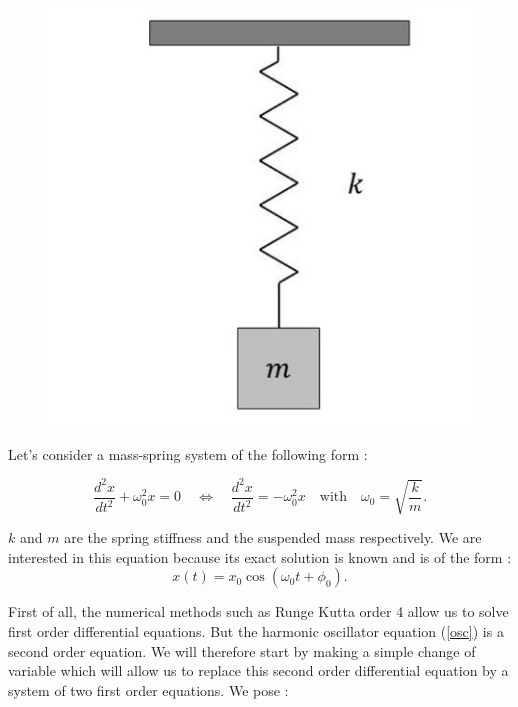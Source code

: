 \documentclass[12pt]{article}
\begin{document}
\begin{figure}[H]
\begin{minipage}[t]{0.48\linewidth}
		\includegraphics[width=\linewidth]{"images/Diff_equation/Harmonic_oss_2.png"}
	\end{minipage}
    \end{figure}
	


	\noindent Let's consider a mass-spring system of the following form :

    \begin{equation}
    	\frac{d^2 x}{d t^2}+\omega_0^2 x = 0 \quad \iff \quad \frac{d^2 x}{d t^2}=-\omega_0^2 x \quad \text{with} \quad \omega_0=\sqrt{\frac{k}{m}}.
    	\label{osc}
    \end{equation}
    
    \noindent $k$ and $m$ are the spring stiffness and the suspended mass respectively. We are interested in this equation because its exact solution is known and is of the form :
    $$x(t) = x_0 \cos(\omega_{0}t+\phi_0).$$
    
    \noindent First of all, the numerical methods such as Runge Kutta order 4  allow us to solve first order differential equations. But the harmonic oscillator equation (\ref{osc}) is a second order equation. We will therefore start by making a simple change of variable which will allow us to replace this second order differential equation by a system of two first order equations. We pose :
     
\end{document}
